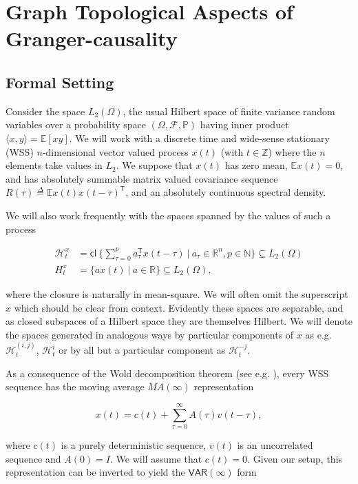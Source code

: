 \documentclass{statsoc}
\def\VAR{\mathsf{VAR}}  %
\def\H{\mathcal{H}}  %
\def\cl{\mathsf{cl\ }}  %
\def\H{\mathcal{H}}  %
\def\E{\mathbb{E}}  %
\def\Z{\mathbb{Z}}  %
\def\R{\mathbb{R}}  %
\def\N{\mathbb{N}}  %
\def\T{\mathsf{T}}  %
\newcommand{\inner}[2]{\langle #1, #2 \rangle}  %
\begin{document}
\section{Graph Topological Aspects of Granger-causality}
\label{sec:theory}
\subsection{Formal Setting}
Consider the space $L_2(\Omega)$, the usual Hilbert space of finite
variance random variables over a probability space
$(\Omega, \mathcal{F}, \mathbb{P})$ having inner product
$\inner{x}{y} = \E[xy]$.  We will work with a discrete time and
wide-sense stationary (WSS) $n$-dimensional vector valued process
$x(t)$ (with $t \in \Z$) where the $n$ elements take values in $L_2$.
We suppose that $x(t)$ has zero mean, $\E x(t) = 0$, and has
absolutely summable matrix valued covariance sequence
$R(\tau) \overset{\Delta}{=} \E x(t)x(t - \tau)^\T$, and an absolutely continuous
spectral density.

We will also work frequently with the spaces spanned by the values of
such a process

\begin{equation}
  \label{eq:hilbert_space_defn}
  \begin{aligned}
    \H_t^x &= \cl \{\sum_{\tau = 0}^p a_\tau^\T x(t - \tau)\ |\ a_\tau \in \R^n, p \in \N\} \subseteq L_2(\Omega)\\
    H_t^x &= \{a x(t)\ |\ a \in \R\} \subseteq L_2(\Omega),
  \end{aligned}
\end{equation}

where the closure is naturally in mean-square.  We will often omit the
superscript $x$ which should be clear from context.  Evidently these
spaces are separable, and as closed subspaces of a Hilbert space they
are themselves Hilbert.  We will denote the spaces generated in
analogous ways by particular components of $x$ as e.g.
$\H_t^{(i, j)}$, $\H_t^{i}$ or by all but a particular component as
$\H_t^{-j}$.

As a consequence of the Wold decomposition theorem (see
e.g. \cite{lindquist}), every WSS sequence has the moving average
$MA(\infty)$ representation

\begin{equation}
  \label{eqn:wold}
  x(t) = c(t) + \sum_{\tau = 0}^\infty A(\tau) v(t - \tau),
\end{equation}

where $c(t)$ is a purely deterministic sequence, $v(t)$ is an
uncorrelated sequence and $A(0) = I$.  We will assume that $c(t) = 0$.
Given our setup, this representation can be inverted to yield the
$\VAR(\infty)$ form
\end{document}
